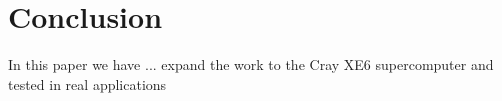 \section{Conclusion}
\label{sec:conclusion}

In this paper we have ...
expand the work to the Cray XE6 supercomputer and tested in real applications 
